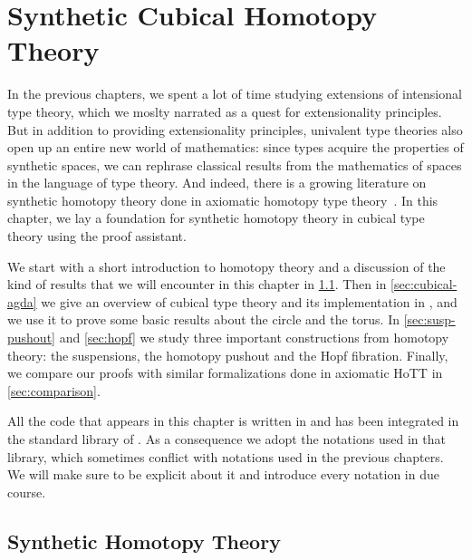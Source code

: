 \setchapterpreamble[u]{\margintoc}
\chapter{Synthetic Cubical Homotopy Theory}

In the previous chapters, we spent a lot of time studying extensions of 
intensional type theory, which we moslty narrated as a quest for extensionality 
principles.
% 
But in addition to providing extensionality principles, univalent type theories 
also open up an entire new world of mathematics: 
since types acquire the properties of synthetic spaces, we can rephrase classical 
results from the mathematics of spaces in the language of type theory.
% 
And indeed, there is a growing literature on synthetic homotopy theory done in 
axiomatic homotopy type theory~\cite{pi1s1,pinsn,Brunerie16,Cavallo15,seifertvankampen,BlakersMassey,vanDoorn18}.
% 
In this chapter, we lay a foundation for synthetic homotopy theory in cubical
type theory using the \CubicalAgda proof assistant.

We start with a short introduction to homotopy theory and a discussion of the
kind of results that we will encounter in this chapter in \cref{sec:synthetic}.
% 
Then in \cref{sec:cubical-agda} we give an overview of cubical type theory and
its implementation in \CubicalAgda, and we use it to prove some basic 
results about the circle and the torus.
% 
In \cref{sec:susp-pushout} and \cref{sec:hopf} we study three important 
constructions from homotopy theory: the suspensions, the homotopy pushout and
the Hopf fibration.
% 
Finally, we compare our proofs with similar formalizations done in axiomatic
HoTT in \cref{sec:comparison}.

All the code that appears in this chapter is written in \Agda and has been
integrated in the standard library of \CubicalAgda. 
% 
% 
As a consequence we adopt the notations used in that library, which sometimes
conflict with notations used in the previous chapters. 
% 
We will make sure to be explicit about it and introduce every notation in due 
course.

\section{Synthetic Homotopy Theory}
\label{sec:synthetic}

